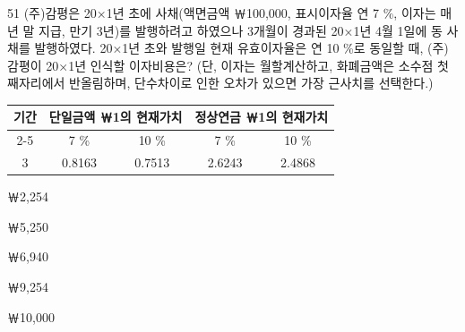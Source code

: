 \begin{question}{51}
(주)감평은 20×1년 초에 사채(액면금액 ￦100,000, 표시이자율 연 7 \%, 이자는 매년 말 지급, 만기 3년)를 발행하려고 하였으나 3개월이 경과된 20×1년 4월 1일에 동 사채를 발행하였다. 20×1년 초와 발행일 현재 유효이자율은 연 10 \%로 동일할 때, (주)감평이 20×1년 인식할 이자비용은? (단, 이자는 월할계산하고, 화폐금액은 소수점 첫째자리에서 반올림하며, 단수차이로 인한 오차가 있으면 가장 근사치를 선택한다.)
\par
{\small\centering
\begin{tabular}{|c|c|c|c|c|}\hline
\multirow{2}{*}{기간} & \multicolumn{2}{c|}{단일금액 ￦1의 현재가치} & \multicolumn{2}{c|}{정상연금 ￦1의 현재가치} \\\cline{2-5}
 & 7 \% & 10 \% & 7 \% & 10 \% \\\hline
3 & 0.8163 & 0.7513 & 2.6243 & 2.4868 \\\hline
\end{tabular}\par}
\begin{choices}
  \item ￦2,254
  \item ￦5,250
  \item ￦6,940
  \item ￦9,254
  \item ￦10,000
\end{choices}
\end{question}
